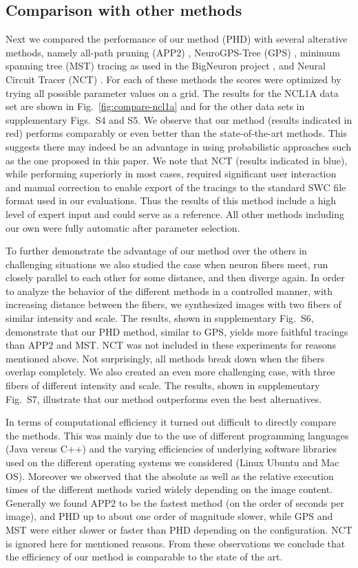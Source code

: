 \documentclass[noinfo,nocrop,final]{bioinfo}
\begin{document}
\subsection{Comparison with other methods}
\label{subsec:comparison-with-other-methods}
Next we compared the performance of our method (PHD) with several alterative methods, namely all-path pruning (APP2) \citep{xiao2013app2}, NeuroGPS-Tree (GPS) \citep{quan2015neurogps}, minimum spanning tree (MST) tracing as used in the BigNeuron project \citep{Peng-2015}, and Neural Circuit Tracer (NCT) \citep{chothani2011automated}. For each of these methods the scores were optimized by trying all possible parameter values on a grid. The results for the NCL1A data set are shown in Fig.~\ref{fig:compare-ncl1a} and for the other data sets in supplementary Figs.~S4 and S5. We observe that our method (results indicated in red) performs comparably or even better than the state-of-the-art methods. This suggests there may indeed be an advantage in using probabilistic approaches such as the one proposed in this paper. We note that NCT (results indicated in blue), while performing superiorly in most cases, required significant user interaction and manual correction to enable export of the tracings to the standard SWC file format used in our evaluations. Thus the results of this method include a high level of expert input and could serve as a reference. All other methods including our own were fully automatic after parameter selection.

To further demonstrate the advantage of our method over the others in challenging situations we also studied the case when neuron fibers meet, run closely parallel to each other for some distance, and then diverge again. In order to analyze the behavior of the different methods in a controlled manner, with increasing distance between the fibers, we synthesized images with two fibers of similar intensity and scale. The results, shown in supplementary Fig.~S6, demonstrate that our PHD method, similar to GPS, yields more faithful tracings than APP2 and MST. NCT was not included in these experiments for reasons mentioned above. Not surprisingly, all methods break down when the fibers overlap completely. We also created an even more challenging case, with three fibers of different intensity and scale. The results, shown in supplementary Fig.~S7, illustrate that our method outperforms even the best alternatives.

In terms of computational efficiency it turned out difficult to directly compare the methods. This was mainly due to the use of different programming languages (Java versus C++) and the varying efficiencies of underlying software libraries used on the different operating systems we considered (Linux Ubuntu and Mac OS). Moreover we observed that the absolute as well as the relative execution times of the different methods varied widely depending on the image content. Generally we found APP2 to be the fastest method (on the order of seconds per image), and PHD up to about one order of magnitude slower, while GPS and MST were either slower or faster than PHD depending on the configuration. NCT is ignored here for mentioned reasons. From these observations we conclude that the efficiency of our method is comparable to the state of the art.
\end{document}
